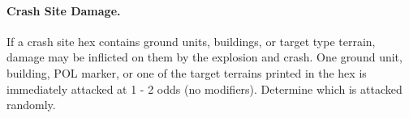 \begin{advancedrules}
\paragraph{Crash Site Damage.} If a crash site hex contains ground units, buildings, or target type terrain, damage may be inflicted on them by the explosion and crash. One ground unit, building, POL marker, or one of the target terrains printed in the hex is immediately attacked at 1 - 2 odds (no modifiers). Determine which is attacked randomly.

\end{advancedrules}

